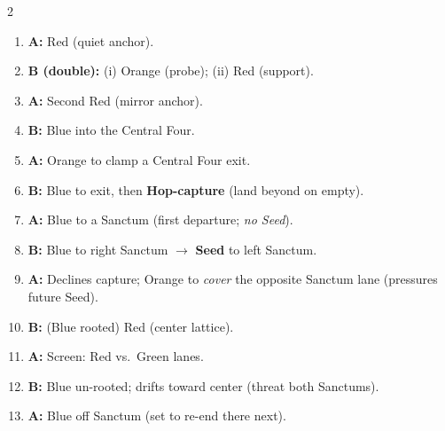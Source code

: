\begin{multicols}{2}
\begin{enumerate}[leftmargin=\textit{,itemsep=0.35em,label=\textbf{M\arabic}:}]

\item \textbf{A:} Red  (quiet anchor). 

\item \textbf{B (double):} (i) Orange  (probe);\; (ii) Red  (support). 

\item \textbf{A:} Second Red  (mirror anchor). 

\item \textbf{B:} Blue  into the Central Four.  

\item \textbf{A:} Orange  to clamp a Central Four exit. 

\item \textbf{B:} Blue  to exit, then \textbf{Hop-capture} (land beyond on empty). \;  

\item \textbf{A:} Blue  to a Sanctum (first departure; \emph{no Seed}). 

\item \textbf{B:} Blue to right Sanctum $\to$ \textbf{Seed} to left Sanctum. \RoC\; 

\item \textbf{A:} Declines capture; Orange  to \emph{cover} the opposite Sanctum lane (pressures future Seed). 

\item \textbf{B:} (Blue rooted) Red  (center lattice). 

\item \textbf{A:} Screen: Red  vs.\ Green lanes. 

\item \textbf{B:} Blue un-rooted; drifts  toward center (threat both Sanctums).

\item \textbf{A:} Blue  off Sanctum (set to re-end there next). 


\end{enumerate}
\end{multicols}
